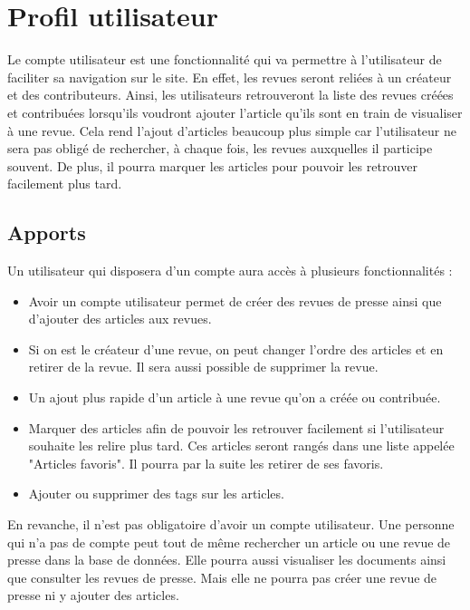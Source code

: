 \section{Profil utilisateur}
\label{sec:profil}

Le compte utilisateur est une fonctionnalité qui va permettre à l'utilisateur de faciliter sa navigation sur le site. En effet, les revues seront reliées à un créateur et des contributeurs. Ainsi, les utilisateurs retrouveront la liste des revues créées et contribuées lorsqu'ils voudront ajouter l'article qu'ils sont en train de visualiser à une revue. Cela rend l'ajout d'articles beaucoup plus simple car l'utilisateur ne sera pas obligé de rechercher, à chaque fois, les revues auxquelles il participe souvent. De plus, il pourra marquer les articles pour pouvoir les retrouver facilement plus tard.

\subsection{Apports}
\label{apport}
 

Un utilisateur qui disposera d'un compte aura accès à plusieurs fonctionnalités :

\begin{itemize}
  \item Avoir un compte utilisateur permet de créer des revues de presse ainsi que d'ajouter des articles aux revues.
	\item Si on est le créateur d'une revue, on peut changer l'ordre des articles et en retirer de la revue. Il sera aussi possible de supprimer la revue.
  \item Un ajout plus rapide d'un article à une revue qu'on a créée ou contribuée.
  \item Marquer des articles afin de pouvoir les retrouver facilement si l'utilisateur souhaite les relire plus tard. Ces articles seront rangés dans une liste appelée "Articles favoris". Il pourra par la suite les retirer de ses favoris.
	\item Ajouter ou supprimer des tags sur les articles.
\end{itemize}

En revanche, il n'est pas obligatoire d'avoir un compte utilisateur. Une personne qui n'a pas de compte peut tout de même rechercher un article ou une revue de presse dans la base de données. Elle pourra aussi visualiser les documents ainsi que consulter les revues de presse. Mais elle ne pourra pas créer une revue de presse ni y ajouter des articles.


